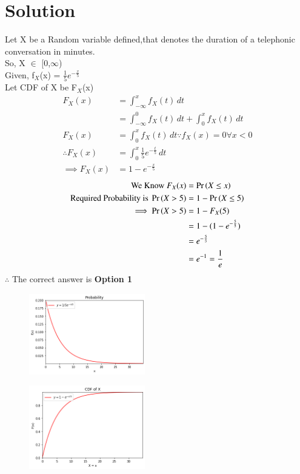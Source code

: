 \documentclass[journal,12pt,twocolumn]{IEEEtran}
\begin{document}
\section{\textbf{Solution}}
Let X be a Random variable defined,that denotes the duration of a telephonic conversation in minutes.\\
So, X $\in$ [0,$\infty$) \\
Given, f$_X$(x) = $\frac{1}{5}e^{-\frac{x}{5}}$ \\
Let CDF of X be F$_X$(x)
\begin{align*}
F_X(x) &=  \int_{-\infty}^{x}f_X(t) \,dt \\
       &= \int_{-\infty}^{0}f_X(t) \,dt + \int_{0}^{x}f_X(t) \,dt \\
F_X(x) &= \int_{0}^{x}f_X(t) \,dt  \because f_X(x) = 0 \forall x<0  \\
\therefore F_X(x) &= \int_{0}^{x}\frac{1}{5}e^{-\frac{t}{5}} \,dt \\
\tag{1}
\label{CDF}
\implies F_X(x) &= 1 - e^{-\frac{x}{5}}
\end{align*}
\begin{align*}
\text{We Know } F_X(x) &= \Pr\left(X \le x\right) \\
\text{Required Probability is }\Pr\left(X > 5\right) &= 1 - \Pr\left(X \le 5\right) \\
\implies \Pr\left(X > 5\right) &= 1 - F_X(5) \\
 &= 1 - (1 - e^{-\frac{5}{5}}) \\
 &= e^{-\frac{5}{5}}  \\
 &= e^{-1} = \frac{1}{e}
\end{align*}
$\therefore$ The correct answer is \textbf{Option 1}
\begin{figure}[!htb]
    \centering
    \includegraphics[width = 0.45\textwidth]{Exp Assignment 5.png}
    \label{EXP}
\end{figure}
\begin{figure}[!htb]
    \centering
    \includegraphics[width = 0.45\textwidth]{CDF assignment 5.png}
    \label{cdf}
\end{figure}
\end{document}
